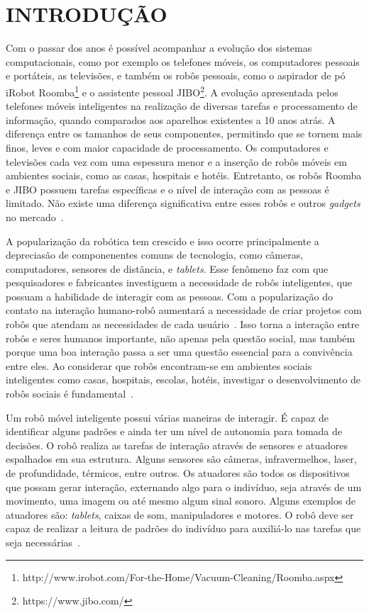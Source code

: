 \chapter{INTRODUÇÃO}
\label{cap:introducao}
Com o passar dos anos é possível acompanhar a evolução dos sistemas computacionais, como por exemplo os telefones móveis, os computadores pessoais e portáteis, as televisões, e também os robôs pessoais, como o aspirador de pó iRobot Roomba\footnote{http://www.irobot.com/For-the-Home/Vacuum-Cleaning/Roomba.aspx} e o assistente pessoal JIBO\footnote{https://www.jibo.com/}. A evolução apresentada pelos telefones móveis inteligentes na realização de diversas tarefas e processamento de informação, quando comparados aos aparelhos existentes a 10 anos atrás. A diferença entre os tamanhos de seus componentes, permitindo que se tornem mais finos, leves e com maior capacidade de processamento. Os computadores e televisões cada vez com uma espessura menor e a inserção de robôs móveis em ambientes sociais, como as casas, hospitais e hotéis. Entretanto, os robôs Roomba e JIBO possuem tarefas específicas e o nível de interação com as pessoas é limitado. Não existe uma diferença significativa entre esses robôs e outros \emph{gadgets} no mercado~\cite{heenan:2014}.

A popularização da robótica tem crescido e isso ocorre principalmente a depreciasão de componenentes comuns de tecnologia, como câmeras, computadores, sensores de distância, e \emph{tablets}. Esse fenômeno faz com que pesquisadores e fabricantes investiguem a necessidade de robôs inteligentes, que possuam a habilidade de interagir com as pessoas. Com a popularização do contato na interação humano-robô aumentará a necessidade de criar projetos com robôs que atendam as necessidades de cada usuário~\cite{looi:2012}. Isso torna a interação entre robôs e seres humanos importante, não apenas pela questão social, mas também porque uma boa interação passa a ser uma questão essencial para a convivência entre eles. Ao considerar que robôs encontram-se em ambientes sociais inteligentes como casas, hospitais, escolas, hotéis, investigar o desenvolvimento de robôs sociais é fundamental~\cite{albo-canals:2013, brown:2013}.

Um robô móvel inteligente possui várias maneiras de interagir. É capaz de identificar alguns padrões e ainda ter um nível de autonomia para tomada de decisões. O robô realiza as tarefas de interação através de sensores e atuadores espalhados em sua estrutura. Alguns sensores são câmeras, infravermelhos, laser, de profundidade, térmicos, entre outros. Os atuadores são todos os dispositivos que possam gerar interação, externando algo para o indivíduo, seja através de um movimento, uma imagem ou até mesmo algum sinal sonoro. Alguns exemplos de atuadores são: \emph{tablets}, caixas de som, manipuladores e motores. O robô deve ser capaz de realizar a leitura de padrões do indivíduo para auxiliá-lo nas tarefas que seja necessárias~\cite{looi:2012, choi:2014, dobra:2014}.

